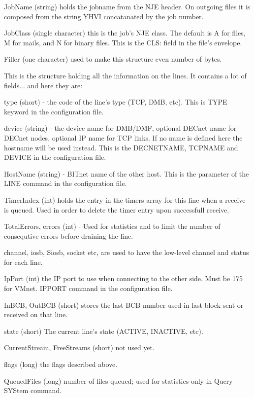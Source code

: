 JobName  (string)  holds  the  jobname  from the NJE header. On outgoing
files it is composed from  the  string  YHVI  concatanated  by  the  job
number.

JobClass  (single character) this is the job's NJE class. The default is
A for files, M for mails, and N for binary files. This is the CLS: field
in the file's envelope.

Filler  (one  character)  used  to  make  this  structure even number of
bytes.


This is the structure holding all the information on  the  lines.  It
contains a lot of fields... and here they are:

type (short) - the code of the line's type (TCP, DMB, etc). This is TYPE
keyword in the configuration file.

device (string) - the device name for DMB/DMF, optional DECnet name  for
DECnet nodes, optional IP name for TCP links. If no name is defined here
the hostname will be used instead. This is the DECNETNAME,  TCPNAME  and
DEVICE in the configuration file.

HostName (string) - BITnet name of the other host. This is the parameter
of the LINE command in the configuration file.

TimerIndex (int) holds the entry in the timers array for this line  when
a  receive  is  queued.  Used  in  order  to delete the timer entry upon
successfull receive.

TotalErrors, errors (int) - Used for statistics and to limit the  number
of consequtive errors before draining the line.

channel, iosb, Siosb, socket etc, are used to have the low-level channel
and status for each line.

IpPort (int) the IP port to use when connecting to the other side.  Must
be 175 for VMnet. IPPORT command in the configuration file.

InBCB, OutBCB (short) stores the last BCB number used in last block sent
or received on that line.

state (short) The current line's state (ACTIVE, INACTIVE, etc).

CurrentStream, FreeStreams (short) not used yet.

flags (long) the flags described above.

QueuedFiles (long) number of files queued; used for statistics  only  in
Query SYStem command.

